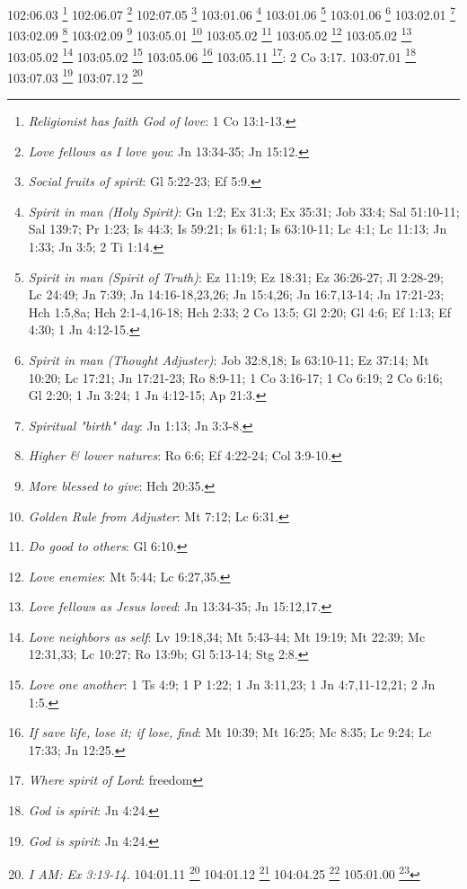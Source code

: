 {{{{{{{{{102:06.03 \footnote{\textit{Religionist has faith God of love}: 1 Co 13:1-13.}
102:06.07 \footnote{\textit{Love fellows as I love you}: Jn 13:34-35; Jn 15:12.}
102:07.05 \footnote{\textit{Social fruits of spirit}: Gl 5:22-23; Ef 5:9.}
103:01.06 \footnote{\textit{Spirit in man (Holy Spirit)}: Gn 1:2; Ex 31:3; Ex 35:31; Job 33:4; Sal 51:10-11; Sal 139:7; Pr 1:23; Is 44:3; Is 59:21; Is 61:1; Is 63:10-11; Lc 4:1; Lc 11:13; Jn 1:33; Jn 3:5; 2 Ti 1:14.}
103:01.06 \footnote{\textit{Spirit in man (Spirit of Truth)}: Ez 11:19; Ez 18:31; Ez 36:26-27; Jl 2:28-29; Lc 24:49; Jn 7:39; Jn 14:16-18,23,26; Jn 15:4,26; Jn 16:7,13-14; Jn 17:21-23; Hch 1:5,8a; Hch 2:1-4,16-18; Hch 2:33; 2 Co 13:5; Gl 2:20; Gl 4:6; Ef 1:13; Ef 4:30; 1 Jn 4:12-15.}
103:01.06 \footnote{\textit{Spirit in man (Thought Adjuster)}: Job 32:8,18; Is 63:10-11; Ez 37:14; Mt 10:20; Lc 17:21; Jn 17:21-23; Ro 8:9-11; 1 Co 3:16-17; 1 Co 6:19; 2 Co 6:16; Gl 2:20; 1 Jn 3:24; 1 Jn 4:12-15; Ap 21:3.}
103:02.01 \footnote{\textit{Spiritual "birth" day}: Jn 1:13; Jn 3:3-8.}
103:02.09 \footnote{\textit{Higher & lower natures}: Ro 6:6; Ef 4:22-24; Col 3:9-10.}
103:02.09 \footnote{\textit{More blessed to give}: Hch 20:35.}
103:05.01 \footnote{\textit{Golden Rule from Adjuster}: Mt 7:12; Lc 6:31.}
103:05.02 \footnote{\textit{Do good to others}: Gl 6:10.}
103:05.02 \footnote{\textit{Love enemies}: Mt 5:44; Lc 6:27,35.}
103:05.02 \footnote{\textit{Love fellows as Jesus loved}: Jn 13:34-35; Jn 15:12,17.}
103:05.02 \footnote{\textit{Love neighbors as self}: Lv 19:18,34; Mt 5:43-44; Mt 19:19; Mt 22:39; Mc 12:31,33; Lc 10:27; Ro 13:9b; Gl 5:13-14; Stg 2:8.}
103:05.02 \footnote{\textit{Love one another}: 1 Ts 4:9; 1 P 1:22; 1 Jn 3:11,23; 1 Jn 4:7,11-12,21; 2 Jn 1:5.}
103:05.06 \footnote{\textit{If save life, lose it; if lose, find}: Mt 10:39; Mt 16:25; Mc 8:35; Lc 9:24; Lc 17:33; Jn 12:25.}
103:05.11 \footnote{\textit{Where spirit of Lord}: freedom}: 2 Co 3:17.}
103:07.01 \footnote{\textit{God is spirit}: Jn 4:24.}
103:07.03 \footnote{\textit{God is spirit}: Jn 4:24.}
103:07.12 \footnote{\textit{I AM: Ex 3:13-14.}
104:01.11 \footnote{\textit{Paul's early view of trinity}: 1 Co 12:4-6.}
104:01.12 \footnote{\textit{Later trinity concept}: Mt 28:19; Hch 2:32-33; 2 Co 13:14; 1 Jn 5:7.}
104:04.25 \footnote{\textit{In him all things consist}: Ro 11:36; Col 1:17; Heb 2:10.}
105:01.00 \footnote{\textit{I AM: Ex 3:13-14.}
105:02.11 \footnote{\textit{Live, move, and have our being}: Job 12:10; Hch 17:28.}
106:02.06 \footnote{\textit{Be you perfect}: Gn 17:1; 1 Re 8:61; Lv 19:2; Dt 18:13; Mt 5:48; 2 Co 13:11; Stg 1:4; 1 P 1:16.}
106:02.06 \footnote{\textit{Michael's perfection}: Jn 14:9-10.}
}}}}}}}}}}
